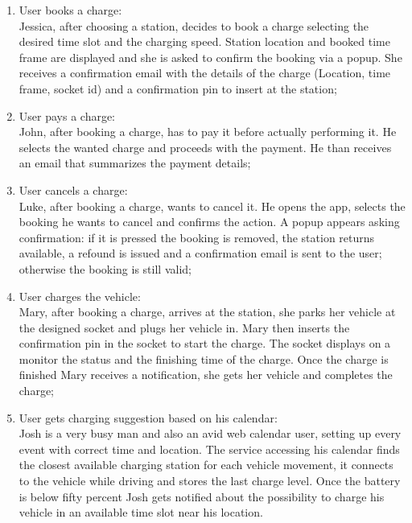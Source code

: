 \begin{enumerate}[label=\textbf{S\arabic*}]
      \item User books a charge:\\
            Jessica, after choosing a station, decides to book a charge selecting the desired time slot and the charging speed. Station location and booked time frame are displayed and she is asked to confirm the booking via a popup. She receives a confirmation email with the details
            of the charge (Location, time frame, socket id) and a confirmation pin to insert at the station;\label{SCE:user-books-charge}
      \item User pays a charge:\\
            John, after booking a charge, has to pay it before actually performing it. He selects the wanted charge and proceeds with the payment. He than receives an email that summarizes the payment details;\label{SCE:user-pays-charge}
      \item User cancels a charge:\\
            Luke, after booking a charge, wants to cancel it. He opens the app, selects the booking he wants to cancel and confirms the action. A popup appears asking confirmation: if it is pressed the booking is removed, the station returns available, a refound is issued and a confirmation email is sent to the user; otherwise the booking is still valid;\label{SCE:user-cancels-charge}
      \item User charges the vehicle:\\
            Mary, after booking a charge, arrives at the station, she parks her vehicle at the designed socket
            and plugs her vehicle in. Mary then inserts the confirmation pin in the socket to start the charge.
            The socket displays on a monitor the status and the finishing time of the charge.
            Once the charge is finished Mary receives a notification,
            she gets her vehicle and completes the charge;\label{SCE:user-charges-vehicle}
      \item User gets charging suggestion based on his calendar:\\
            Josh is a very busy man and also an avid web calendar user,
            setting up every event with correct time and location.
            The service accessing his calendar finds the closest available charging station for each vehicle movement,
            it connects to the vehicle while driving and stores the last charge level. Once the battery is below fifty percent Josh gets notified
            about the possibility to charge his vehicle in an available time slot near his location.

\end{enumerate}
